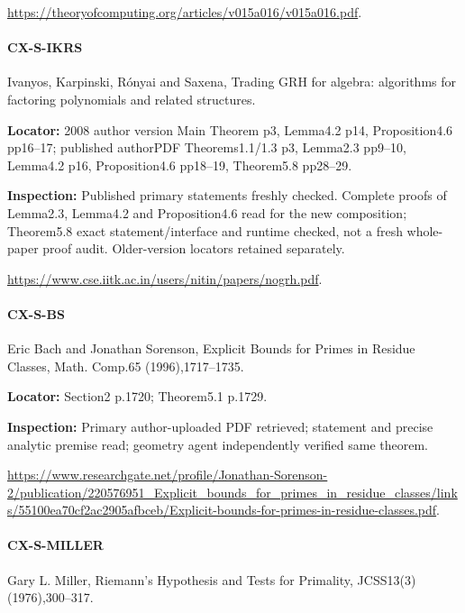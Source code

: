 \documentclass[11pt,a4paper]{article}
\begin{document}
\url{https://theoryofcomputing.org/articles/v015a016/v015a016.pdf}.

\paragraph{CX-S-IKRS} Ivanyos, Karpinski, Rónyai and Saxena, Trading GRH for algebra:\allowbreak{} algorithms for factoring polynomials and related structures.

\textbf{Locator:} 2008 author version Main Theorem p3, Lemma4.\allowbreak{}2 p14, Proposition4.\allowbreak{}6 pp16–\allowbreak{}17; published authorPDF Theorems1.\allowbreak{}1/\allowbreak{}1.\allowbreak{}3 p3, Lemma2.\allowbreak{}3 pp9–\allowbreak{}10, Lemma4.\allowbreak{}2 p16, Proposition4.\allowbreak{}6 pp18–\allowbreak{}19, Theorem5.\allowbreak{}8 pp28–\allowbreak{}29.

\textbf{Inspection:} Published primary statements freshly checked.\allowbreak{} Complete proofs of Lemma2.\allowbreak{}3, Lemma4.\allowbreak{}2 and Proposition4.\allowbreak{}6 read for the new composition; Theorem5.\allowbreak{}8 exact statement/\allowbreak{}interface and runtime checked, not a fresh whole-paper proof audit.\allowbreak{} Older-version locators retained separately.\allowbreak{}

\url{https://www.cse.iitk.ac.in/users/nitin/papers/nogrh.pdf}.

\paragraph{CX-S-BS} Eric Bach and Jonathan Sorenson, Explicit Bounds for Primes in Residue Classes, Math.\allowbreak{} Comp.\allowbreak{}65 (1996),1717–\allowbreak{}1735.

\textbf{Locator:} Section2 p.\allowbreak{}1720; Theorem5.\allowbreak{}1 p.\allowbreak{}1729.

\textbf{Inspection:} Primary author-uploaded PDF retrieved; statement and precise analytic premise read; geometry agent independently verified same theorem.\allowbreak{}

\url{https://www.researchgate.net/profile/Jonathan-Sorenson-2/publication/220576951_Explicit_bounds_for_primes_in_residue_classes/links/55100ea70cf2ac2905afbceb/Explicit-bounds-for-primes-in-residue-classes.pdf}.

\paragraph{CX-S-MILLER} Gary L.\allowbreak{} Miller, Riemann’s Hypothesis and Tests for Primality, JCSS13(3) (1976),300–\allowbreak{}317.
\end{document}
